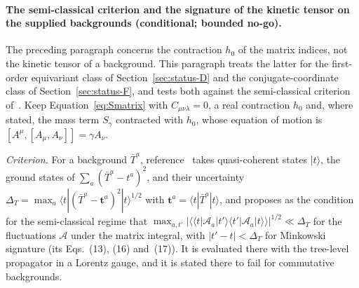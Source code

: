 \paragraph{The semi-classical criterion and the signature of the kinetic tensor on the supplied backgrounds (conditional; bounded no-go).}
The preceding paragraph concerns the contraction \(h_0\) of the matrix indices, not the kinetic tensor of a background. This paragraph treats the latter for the first-order equivariant class of Section~\ref{sec:status-D} and the conjugate-coordinate class of Section~\ref{sec:status-F}, and tests both against the semi-classical criterion of~\cite{Steinacker2026Weak}. Keep Equation~\eqref{eq:Smatrix} with \(C_{\mu\nu\lambda}=0\), a real contraction \(h_0\) and, where stated, the mass term \(S_\gamma\) contracted with \(h_0\), whose equation of motion is \([A^\mu,[A_\mu,A_\nu]]=\gamma A_\nu\).

\emph{Criterion.} For a background \(\bar T^a\), reference~\cite{Steinacker2026Weak} takes quasi-coherent states \(|t\rangle\), the ground states of \(\sum_a(\bar T^a-t^a)^2\), and their uncertainty \(\Delta_T=\max_a\langle t|(\bar T^a-\mathbf t^a)^2|t\rangle^{1/2}\) with \(\mathbf t^a=\langle t|\bar T^a|t\rangle\), and proposes as the condition for the semi-classical regime that \(\max_{a,t'}\bigl|\bigl\langle\langle t|\mathcal A_a|t'\rangle\langle t'|\mathcal A_a|t\rangle\bigr\rangle\bigr|^{1/2}\ll\Delta_T\) for the fluctuations \(\mathcal A\) under the matrix integral, with \(|t'-t|<\Delta_T\) for Minkowski signature (its Eqs.~(13), (16) and~(17)). It is evaluated there with the tree-level propagator in a Lorentz gauge, and it is stated there to fail for commutative backgrounds.

